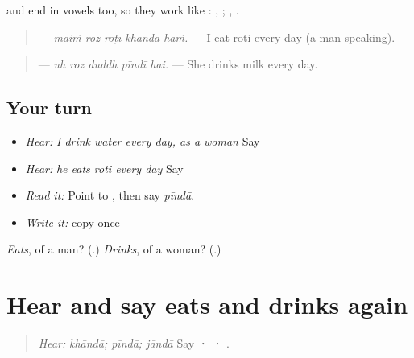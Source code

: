 \begin{grammarlens}[title={Grammar Lens: \pa{ਖਾ} and \pa{ਪੀ}}]
\textbf{} and \textbf{} end in vowels too, so they work like \textbf{}: \textbf{}, \textbf{}; \textbf{}, \textbf{}.

\begin{quote}
\textbf{    } — \emph{maiṁ roz roṭī khāndā hāṁ.} — I eat roti every day (a man speaking).
\end{quote}

\begin{quote}
\textbf{    } — \emph{uh roz duddh pīndī hai.} — She drinks milk every day.
\end{quote}
\end{grammarlens}

\subsection*{Your turn}
\begin{itemize}
\raggedright
  \item \emph{Hear:} \emph{I drink water every day, as a woman} Say \textbf{    }
  \item \emph{Hear:} \emph{he eats roti every day} Say \textbf{    }
  \item \emph{Read it:} \textbf{} Point to \textbf{}, then say \emph{pīndā}.
  \item \emph{Write it:} copy \textbf{} once
\end{itemize}

\begin{tcolorbox}[breakable,colback=teal!4,colframe=teal!35!black,title={Before you move on}]
\emph{Eats}, of a man? (\textbf{}.) \emph{Drinks}, of a woman? (\textbf{}.)
\end{tcolorbox}
\section[\texorpdfstring{\pa{ਖਾਂਦਾ} · \pa{ਪੀਂਦਾ} (khāndā · pīndā)}{ਖਾਂਦਾ · ਪੀਂਦਾ (khāndā · pīndā)}]{Hear and say eats and drinks again}

\label{lesson:PA-C211-khanda-review}



\begin{quote}
\emph{Hear:} \emph{khāndā; pīndā; jāndā} Say \textbf{ ·  · }.
\end{quote}

